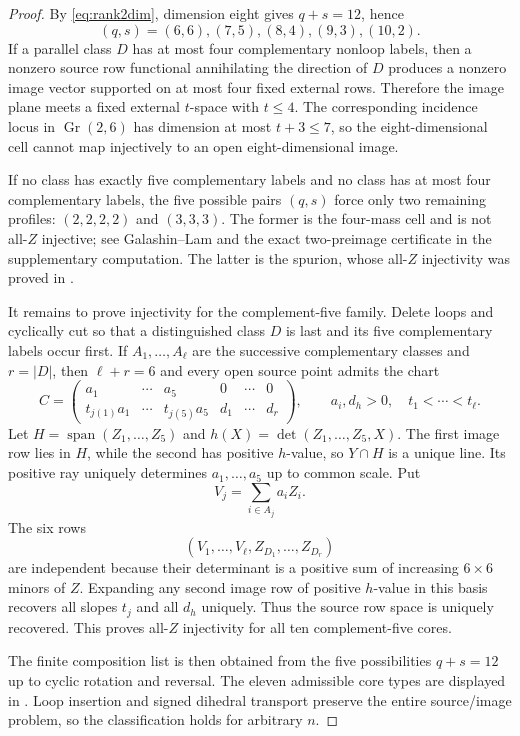 \documentclass[11pt]{article}
\newcommand{\Gr}{\operatorname{Gr}}
\newcommand{\1}{\mathbf 1}
\newcommand{\Span}{\operatorname{span}}
\begin{document}
\begin{proof}
By \eqref{eq:rank2dim}, dimension eight gives $q+s=12$, hence
\[
(q,s)=(6,6),(7,5),(8,4),(9,3),(10,2).
\]
If a parallel class $D$ has at most four complementary nonloop labels,
then a nonzero source row functional annihilating the direction of $D$
produces a nonzero image vector supported on at most four fixed external
rows.  Therefore the image plane meets a fixed external $t$-space with
$t\le4$.  The corresponding incidence locus in $\Gr(2,6)$ has dimension
at most $t+3\le7$, so the eight-dimensional cell cannot map injectively to
an open eight-dimensional image.

If no class has exactly five complementary labels and no class has at most
four complementary labels, the five possible pairs $(q,s)$ force only two
remaining profiles: $(2,2,2,2)$ and $(3,3,3)$.  The former is the
four-mass cell and is not all-$Z$ injective; see Galashin--Lam
\cite{GalashinLam} and the exact two-preimage certificate in the
supplementary computation.  The latter is the spurion, whose all-$Z$
injectivity was proved in \cite{ClusterResults}.

It remains to prove injectivity for the complement-five family.  Delete
loops and cyclically cut so that a distinguished class $D$ is last and
its five complementary labels occur first.  If
$A_1,\dots,A_\ell$ are the successive complementary classes and
$r=|D|$, then $\ell+r=6$ and every open source point admits the chart
\[
C=\begin{pmatrix}
 a_1&\cdots&a_5&0&\cdots&0\\
 t_{j(1)}a_1&\cdots&t_{j(5)}a_5&d_1&\cdots&d_r
\end{pmatrix},
\qquad a_i,d_h>0,\quad t_1<\cdots<t_\ell.
\]
Let $H=\Span(Z_1,\dots,Z_5)$ and
$h(X)=\det(Z_1,\dots,Z_5,X)$.  The first image row lies in $H$, while the
second has positive $h$-value, so $Y\cap H$ is a unique line.  Its positive
ray uniquely determines $a_1,\dots,a_5$ up to common scale.  Put
\[
V_j=\sum_{i\in A_j}a_iZ_i.
\]
The six rows
\[
(V_1,\dots,V_\ell,Z_{D_1},\dots,Z_{D_r})
\]
are independent because their determinant is a positive sum of increasing
$6\times6$ minors of $Z$.  Expanding any second image row of positive
$h$-value in this basis recovers all slopes $t_j$ and all $d_h$ uniquely.
Thus the source row space is uniquely recovered.  This proves all-$Z$
injectivity for all ten complement-five cores.

The finite composition list is then obtained from the five possibilities
$q+s=12$ up to cyclic rotation and reversal.  The eleven admissible core
types are displayed in .  Loop insertion and
signed dihedral transport preserve the entire source/image problem, so the
classification holds for arbitrary $n$.
\end{proof}
\end{document}
